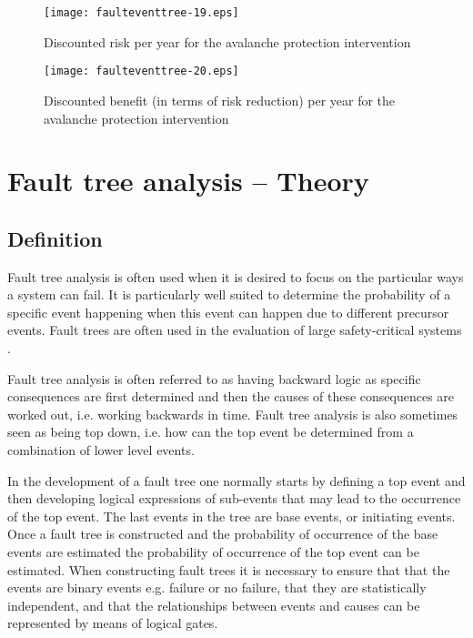 \begin{figure}[h]
\begin{center}
\texttt{[image: faulteventtree-19.eps]}
\caption{Discounted risk per year for the avalanche protection intervention}
\end{center}
\end{figure}

\begin{figure}[h]
\begin{center}
\texttt{[image: faulteventtree-20.eps]}
\caption{Discounted benefit (in terms of risk reduction) per year for the
avalanche protection intervention}\label{figeventfault:5}
\end{center}
\end{figure}
\section{Fault tree analysis -- Theory}
\subsection{Definition}
Fault tree analysis is often used when it is desired to focus on the particular
ways a system can fail. It is particularly well suited to determine the
probability of a specific event happening when this event can happen due to
different precursor events. Fault trees are often used in the evaluation of large
safety-critical systems \citep{Andrews2012}.

Fault tree analysis is often referred to as having backward logic as specific
consequences are first determined and then the causes of these consequences are
worked out, i.e. working backwards in time. Fault tree analysis is also sometimes
seen as being top down, i.e. how can the top event be determined from a
combination of lower level events.

In the development of a fault tree one normally starts by defining a top event
and then developing logical expressions of sub-events that may lead to the
occurrence of the top event. The last events in the tree are base events, or
initiating events. Once a fault tree is constructed and the probability of
occurrence of the base events are estimated the probability of occurrence of the
top event can be estimated. When constructing fault trees it is necessary to
ensure that that the events are binary events e.g. failure or no failure, that
they are statistically independent, and that the relationships between events and
causes can be represented by means of logical gates.

